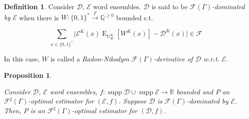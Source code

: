 \documentclass{article}
\numberwithin{equation}{section}
\theoremstyle{definition}
\newtheorem{definition}{Definition}[section]
\theoremstyle{plain}
\newtheorem{proposition}{Proposition}[section]
\newcommand{\Bool}{\{0,1\}}
\newcommand{\Words}{{\Bool^*}}
\DeclareMathOperator{\Supp}{supp}
\DeclareMathOperator{\E}{E}
\DeclareMathOperator{\Un}{U}
\newcommand{\Rats}{\mathbb{Q}}
\newcommand{\Reals}{\mathbb{R}}
\newcommand{\Abs}[1]{\lvert #1 \rvert}
\newcommand{\Dist}{\mathcal{D}}
\newcommand{\Fall}{\mathcal{F}}
\newcommand{\EG}{\Fall(\Gamma)}
\newcommand{\ESG}{\Fall^\sharp(\Gamma)}
\newcommand{\Scheme}{\xrightarrow{\Gamma}}
\begin{document}
\begin{samepage}
\begin{definition}

Consider ${\Dist}$, ${\mathcal{E}}$ word ensembles. ${\Dist}$ is said to be \emph{${\EG}$-dominated by ${\mathcal{E}}$} when there is ${W: \Words \Scheme \Rats^{\geq 0}}$ bounded s.t.

\begin{equation}
\sum_{x \in \Words} \Abs{\mathcal{E}^{K}(x)\E_{\Un_W^K}[W^K(x)]-\Dist^{K}(x)} \in \Fall
\end{equation}

In this case, ${W}$ is called a \emph{Radon-Nikodym ${\EG}$-derivative of ${\Dist}$ w.r.t. ${\mathcal{E}}$}.

\end{definition}
\end{samepage}

\begin{samepage}
\begin{proposition}
\label{prp:dom_reduce_sharp}

Consider ${\Dist}$, ${\mathcal{E}}$ word ensembles, ${f: \Supp \Dist \cup \Supp \mathcal{E} \rightarrow \Reals}$ bounded and ${P}$ an ${\ESG}$-optimal estimator for ${(\mathcal{E},f)}$. Suppose ${\Dist}$ is ${\EG}$-dominated by ${\mathcal{E}}$. Then, ${P}$ is an ${\ESG}$-optimal estimator for ${(\Dist,f)}$.

\end{proposition}
\end{samepage}
\end{document}
